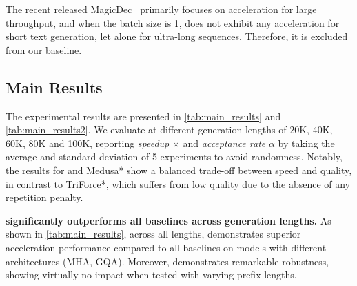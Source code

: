 The recent released MagicDec~\citep{magicdec} primarily focuses on acceleration for large throughput, and when the batch size is 1, \llama does not exhibit any acceleration for short text generation, let alone for ultra-long sequences. Therefore, it is excluded from our baseline.

\subsection{Main Results}




The experimental results are presented in \cref{tab:main_results} and \cref{tab:main_results2}. We evaluate \ours at different generation lengths of 20K, 40K, 60K, 80K and 100K, reporting \emph{speedup} $\times$ and \emph{acceptance rate} $\alpha$ by taking the average and standard deviation of 5 experiments to avoid randomness. Notably, the results for \ours and Medusa* show a balanced trade-off between speed and quality, in contrast to TriForce*, which suffers from low quality due to the absence of any repetition penalty. %

\textbf{\ours significantly outperforms all baselines across generation lengths.}
As shown in \cref{tab:main_results}, across all lengths, \ours demonstrates superior acceleration performance compared to all baselines on models with different architectures (MHA, GQA). Moreover, \ours demonstrates remarkable robustness, showing virtually no impact when tested with varying prefix lengths.

